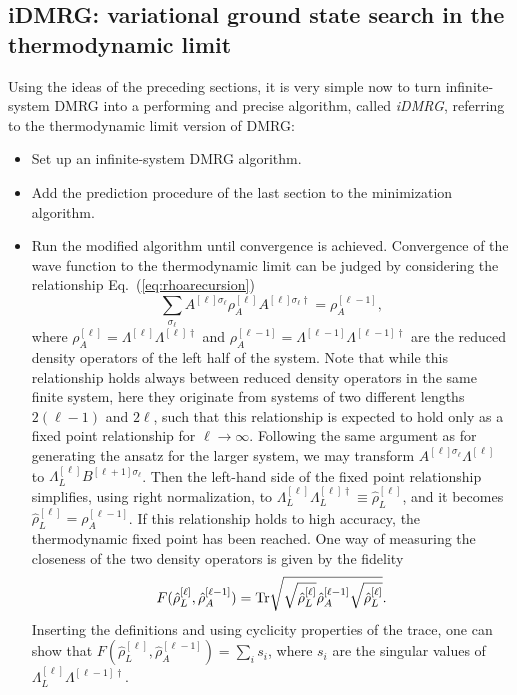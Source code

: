 \documentclass[a4paper,10pt,oneside,onecolumn,1p,times]{elsarticle}
\newcommand{\tr}{{\rm Tr }}
\begin{document}
\subsection{iDMRG: variational ground state search in the thermodynamic limit}
Using the ideas of the preceding sections, it is very simple now to turn infinite-system DMRG into a performing and precise algorithm, called {\em iDMRG}, referring to the thermodynamic limit version of DMRG:
\begin{itemize}
\item Set up an infinite-system DMRG algorithm.
\item Add the prediction procedure of the last section to the minimization algorithm.
\item Run the modified algorithm until convergence is achieved. Convergence of the wave function
to the thermodynamic limit can be judged by considering the relationship Eq.~(\ref{eq:rhoarecursion})
\begin{equation}
\sum_{\sigma_\ell} A^{[\ell]\sigma_\ell} \rho_A^{[\ell]} A^{[\ell]\sigma_\ell\dagger} = \rho_A^{[\ell-1]} ,
\end{equation}
where $\rho_A^{[\ell]} = \Lambda^{[\ell]}\Lambda^{[\ell]\dagger}$ and $\rho_A^{[\ell-1]} = \Lambda^{[\ell-1]}\Lambda^{[\ell-1]\dagger}$ are the reduced density operators of the left half of the system. Note that while this relationship holds always between reduced density operators in the same finite system, here they originate from systems of two different lengths $2(\ell-1)$ and $2\ell$, such that this relationship is expected to hold only as a fixed point relationship for $\ell\rightarrow\infty$. Following the same argument as for generating the ansatz for the larger system, we may transform $A^{[\ell]\sigma_\ell}\Lambda^{[\ell]}$ to $\Lambda^{[\ell]}_L B^{[\ell+1]\sigma_\ell}$. Then the left-hand side of the fixed point relationship simplifies, using right normalization, to $\Lambda^{[\ell]}_L\Lambda^{[\ell]\dagger}_L \equiv \hat{\rho}^{[\ell]}_L$, and it becomes $\hat{\rho}^{[\ell]}_L = \rho_A^{[\ell-1]}$. If this relationship holds to high accuracy, the thermodynamic fixed point has been reached.  
One way of measuring the closeness of the two density operators is given by the fidelity \cite{McCulloch08}
\begin{equation}
F(\hat{\rho}^{[\ell]}_L, \hat{\rho}_A^{[\ell-1]}) = \tr \sqrt{\sqrt{\hat{\rho}^{[\ell]}_L}\hat{\rho}_A^{[\ell-1]} \sqrt{\hat{\rho}^{[\ell]}_L}} .
\end{equation}
Inserting the definitions and using cyclicity properties of the trace, one can show that $F(\hat{\rho}^{[\ell]}_L, \hat{\rho}^{[\ell-1]}_A) = \sum_i s_i$, where $s_i$ are the singular values of  $\Lambda^{[\ell]}_L \Lambda^{[\ell-1]\dagger}$. 
\end{itemize}
\end{document}
